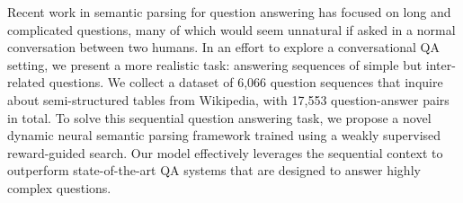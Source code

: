 Recent work in semantic parsing for question answering has focused on long and complicated questions, many of which would seem unnatural if asked in a normal conversation between two humans. In an effort to explore a conversational QA setting, we present a more realistic task: answering sequences of simple but inter-related questions. We collect a dataset of 6,066 question sequences that inquire about semi-structured tables from Wikipedia, with 17,553 question-answer pairs in total. To solve this sequential question answering task, we propose a novel dynamic neural semantic parsing framework trained using a weakly supervised reward-guided search. Our model effectively leverages the sequential context to outperform state-of-the-art QA systems that are designed to answer highly complex questions.
